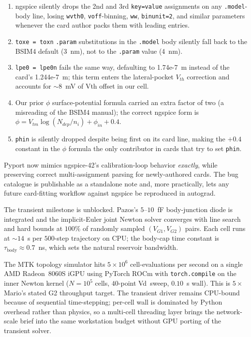 \documentclass[fontsize=10pt]{article}
\begin{document}
\begin{enumerate}\setlength{\itemsep}{1pt}
  \item ngspice silently drops the 2nd and 3rd \texttt{key=value} assignments on
        any \texttt{.model}-body line, losing \texttt{wvth0}, \texttt{voff}-binning,
        \texttt{ww}, \texttt{binunit=2}, and similar parameters whenever the card
        author packs them with leading entries.
  \item \texttt{toxe = toxn} \texttt{.param} substitutions in the \texttt{.model}
        body silently fall back to the BSIM4 default (3~nm), not to the
        \texttt{.param} value (4~nm).
  \item \texttt{lpe0 = lpe0n} fails the same way, defaulting to 1.74e-7~m
        instead of the card's 1.244e-7~m; this term enters the lateral-pocket
        $V_{th}$ correction and accounts for $\sim 8$~mV of Vth offset in our cell.
  \item Our prior $\phi$ surface-potential formula carried an extra factor of two
        (a misreading of the BSIM4 manual); the correct ngspice form is
        $\phi = V_{tm} \log(N_{dep}/n_i) + \phi_{in} + 0.4$.
  \item \texttt{phin} is silently dropped despite being first on its card line,
        making the $+0.4$ constant in the $\phi$ formula the only contributor in
        cards that try to set \texttt{phin}.
\end{enumerate}

Pyport now mimics ngspice-42's calibration-loop behavior \emph{exactly}, while
preserving correct multi-assignment parsing for newly-authored cards. The bug
catalogue is publishable as a standalone note and, more practically, lets any
future card-fitting workflow against ngspice be reproduced in autograd.

The transient milestone is unblocked. Pazos's $5$--$10$~fF body-junction diode is
integrated and the implicit-Euler joint Newton solver converges with line search and
hard bounds at $100\%$ of randomly sampled $(V_{G1}, V_{G2})$ pairs. Each cell runs at
$\sim 14$~s per $500$-step trajectory on CPU; the body-cap time constant is
$\tau_{\mathrm{body}} \approx 0.7$~ns, which sets the natural reservoir bandwidth.

The MTK topology simulator hits $5 \times 10^6$ cell-evaluations per second on a
single AMD Radeon~8060S iGPU using PyTorch ROCm with \texttt{torch.compile} on the
inner Newton kernel ($N=10^5$ cells, $40$-point Vd~sweep, $0.10$~s wall). This is
$5\times$ Mario's stated G2 throughput target. The transient driver remains CPU-bound
because of sequential time-stepping; per-cell wall is dominated by Python overhead
rather than physics, so a multi-cell threading layer brings the network-scale brief
into the same workstation budget without GPU porting of the transient solver.
\end{document}

